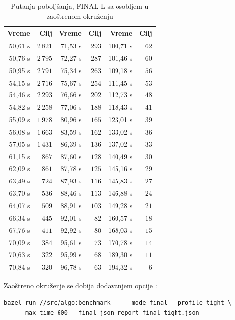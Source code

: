 \documentclass[12pt,oneside]{memoir}
\begin{document}
\begin{table}[ht]
\centering
\caption{Putanja poboljšanja, FINAL-L sa osobljem u zaoštrenom okruženju}
\label{tbl:tight_traj_l}
\begin{tabular}{rr@{\hskip 2em}rr@{\hskip 2em}rr}
\toprule
\textbf{Vreme} & \textbf{Cilj} & \textbf{Vreme} & \textbf{Cilj}
& \textbf{Vreme} & \textbf{Cilj} \\
\midrule
50,61 s & $2\,821$ & 71,53 s & $293$ & 100,71 s & $62$ \\
50,76 s & $2\,795$ & 72,27 s & $287$ & 101,46 s & $60$ \\
50,95 s & $2\,791$ & 75,34 s & $263$ & 109,18 s & $56$ \\
54,15 s & $2\,716$ & 75,67 s & $254$ & 111,45 s & $53$ \\
54,46 s & $2\,293$ & 76,66 s & $202$ & 112,73 s & $48$ \\
54,82 s & $2\,258$ & 77,06 s & $188$ & 118,43 s & $41$ \\
55,09 s & $1\,978$ & 80,96 s & $165$ & 123,01 s & $39$ \\
56,08 s & $1\,663$ & 83,59 s & $162$ & 133,02 s & $36$ \\
57,05 s & $1\,431$ & 86,39 s & $136$ & 137,02 s & $33$ \\
61,15 s & $867$    & 87,60 s & $128$ & 140,49 s & $30$ \\
62,09 s & $861$    & 87,78 s & $125$ & 145,16 s & $29$ \\
63,49 s & $724$    & 87,93 s & $116$ & 145,83 s & $27$ \\
63,70 s & $536$    & 88,46 s & $113$ & 146,88 s & $24$ \\
64,07 s & $509$    & 88,91 s & $103$ & 149,28 s & $21$ \\
66,34 s & $445$    & 92,01 s & $82$  & 160,57 s & $18$ \\
67,76 s & $411$    & 92,92 s & $80$  & 168,03 s & $15$ \\
70,09 s & $384$    & 95,61 s & $73$  & 170,78 s & $14$ \\
70,63 s & $322$    & 95,99 s & $68$  & 189,30 s & $11$ \\
70,84 s & $320$    & 96,78 s & $63$  & 194,32 s & $6$  \\
\bottomrule
\end{tabular}
\end{table}

Zaoštreno okruženje se dobija dodavanjem opcije :

\begin{english}
\begin{verbatim}
bazel run //src/algo:benchmark -- --mode final --profile tight \
    --max-time 600 --final-json report_final_tight.json
\end{verbatim}
\end{english}
\end{document}
